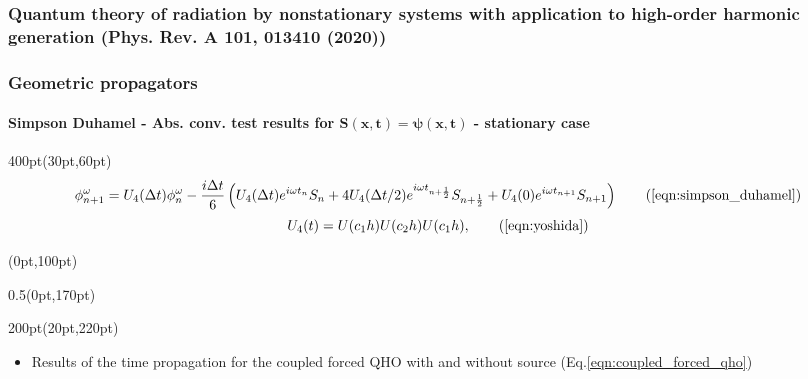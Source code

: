 \begin{frame}
\frametitle{Quantum theory of radiation by nonstationary systems 
	with application to high-order harmonic generation
        (Phys. Rev. A 101, 013410 (2020))}
\frametitle{Geometric propagators}
	\framesubtitle{Simpson Duhamel - 
	Abs. conv. test results for
	$\mathbf{S(x,t) = \psi(x,t)}$ 	 - stationary case }
\footnotesize
\begin{textblock*}{400pt}(30pt,60pt)
	\begin{equation}
		\phi^\omega_{n+1} = U_4(\Delta t) \phi^\omega_{n}
		- \frac{i\Delta t}{6}\left(
		  U_4(\Delta t)  e^{i\omega t_{n}}     S_{n}
		+ 4 U_4(\Delta t/2) e^{i\omega t_{n+\frac{1}{2}}} S_{n+\frac{1}{2}}
		+   U_4(0) e^{i\omega t_{n+1}} S_{n+1}
		\right)
		 \tag{\ref{eqn:simpson_duhamel}}
	\end{equation}
 	\begin{equation}
		U_4(t) =  U(c_1h)  U(c_2h)  U(c_1h),    
		 \tag{\ref{eqn:yoshida}}
 	\end{equation}
\end{textblock*}

\footnotesize
\begin{textblock*}{\linewidth}(0pt,100pt)
\end{textblock*}
\begin{textblock*}{0.5\linewidth}(0pt,170pt)
\end{textblock*}


\begin{textblock*}{200pt}(20pt,220pt)
	\begin{itemize}
	 \item Results of the time propagation for the coupled forced QHO
		 with and without source (Eq.\ref{eqn:coupled_forced_qho})
	\end{itemize}
\end{textblock*}



\end{frame}
